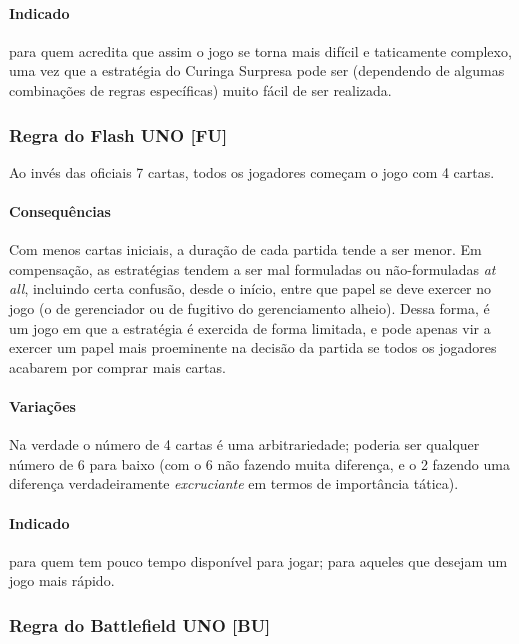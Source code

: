 \paragraph{Indicado}

para quem acredita que assim o jogo se torna mais difícil e taticamente complexo, uma vez que a estratégia do Curinga Surpresa pode ser (dependendo de algumas combinações de regras específicas) muito fácil de ser realizada.

\subsubsection{Regra do Flash UNO [FU]}

Ao invés das oficiais 7 cartas, todos os jogadores começam o jogo com 4 cartas.

\paragraph{Consequências}

Com menos cartas iniciais, a duração de cada partida tende a ser menor. Em compensação, as estratégias tendem a ser mal formuladas ou não-formuladas \emph{at all}, incluindo certa confusão, desde o início, entre que papel se deve exercer no jogo (o de gerenciador ou de fugitivo do gerenciamento alheio). Dessa forma, é um jogo em que a estratégia é exercida de forma limitada, e pode apenas vir a exercer um papel mais proeminente na decisão da partida se todos os jogadores acabarem por comprar mais cartas.	

\paragraph{Variações}

Na verdade o número de 4 cartas é uma arbitrariedade; poderia ser qualquer número de 6 para baixo (com o 6 não fazendo muita diferença, e o 2 fazendo uma diferença verdadeiramente \emph{excruciante} em termos de importância tática).

\paragraph{Indicado}

para quem tem pouco tempo disponível para jogar; para aqueles que desejam um jogo mais rápido.

\subsubsection{Regra do Battlefield UNO [BU]}

